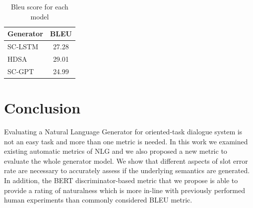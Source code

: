 \documentclass[11pt]{article}
\begin{document}


\begin{table}[H]
\centering
\begin{tabular}{|l|c|}
\hline
\textbf{Generator} & \textbf{BLEU} \\ \hline
SC-LSTM & 27.28 \\ \hline
HDSA & 29.01 \\ \hline
SC-GPT & 24.99 \\ \hline
\end{tabular}
\caption{Bleu score for each model}
\label{tab:bleu}
\end{table}




\section{Conclusion}
Evaluating a Natural Language Generator for oriented-task dialogue system is not an easy task and more than one metric is needed. In this work we examined existing automatic metrics of NLG and we also proposed a new metric to evaluate the whole generator model. We show that different aspects of slot error rate are necessary to accurately assess if the underlying semantics are generated. In addition, the BERT discriminator-based metric that we propose is able to provide a rating of naturalness which is more in-line with previously performed human experiments than commonly considered BLEU metric.
\end{document}
